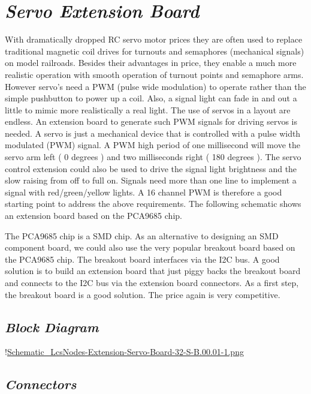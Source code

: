 \chapter{\textit{Servo Extension Board}}

With dramatically dropped RC servo motor prices they are often used to replace traditional magnetic coil drives for turnouts and semaphores (mechanical signals) on model railroads. Besides their advantages in price, they enable a much more realistic operation with smooth operation of turnout points and semaphore arms. However servo’s need a PWM (pulse wide modulation) to operate rather than the simple pushbutton to power up a coil. Also, a signal light can fade in and out a little to mimic more realistically a real light. The use of servos in a layout are endless. An extension board to generate such PWM signals for driving servos is needed. A servo is just a mechanical device that is controlled with a pulse width modulated (PWM) signal. A PWM high period of one millisecond will move the servo arm left ( 0 degrees ) and two milliseconds right ( 180 degrees ). The servo control extension could also be used to drive the signal light brightness and the slow raising from off to full on. Signals need more than one line to implement a signal with red/green/yellow lights. A 16 channel PWM is therefore a good starting point to address the above requirements. The following schematic shows an extension board based on the PCA9685 chip.

The PCA9685 chip is a SMD chip. As an alternative to designing an SMD component board, we could also use the very popular breakout board based on the PCA9685 chip. The breakout board interfaces via the I2C bus. A good solution is to build an extension board that just piggy backs the breakout board and connects to the I2C bus via the extension board connectors. As a first step, the breakout board is a good solution. The price again is very competitive.

\section{\textit{Block Diagram}}

!\href{./Schematics/Schematic_LcsNodes-Extension-Servo-Board-32-S-B.00.01-1.png }{Schematic_LcsNodes-Extension-Servo-Board-32-S-B.00.01-1.png}

\section{\textit{Connectors}}

